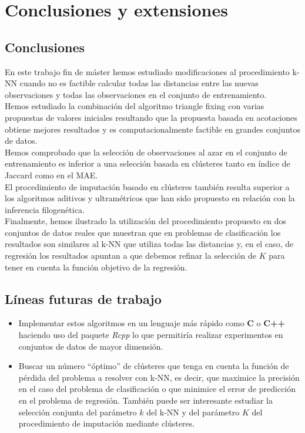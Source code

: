 \documentclass[12pt]{report} %
\theoremstyle{definition}
\begin{document}
\chapter{Conclusiones y extensiones}

\section{Conclusiones}

En este trabajo fin de máster hemos estudiado modificaciones al procedimiento k-NN cuando no es factible calcular todas las distancias entre las nuevas observaciones y todas las observaciones en el conjunto de entrenamiento.\\

Hemos estudiado la combinación del algoritmo triangle fixing con varias propuestas de valores iniciales resultando que la propuesta basada en acotaciones obtiene mejores resultados y es computacionalmente factible en grandes conjuntos de datos.\\

Hemos comprobado que la selección de observaciones al azar en el conjunto de entrenamiento es inferior a una selección basada en clústeres tanto en índice de Jaccard como en el MAE.\\

El procedimiento de imputación basado en clústeres también resulta superior a los algoritmos aditivos y ultramétricos que han sido propuesto en relación con la inferencia filogenética.\\

Finalmente, hemos ilustrado la utilización del procedimiento propuesto en dos conjuntos de datos reales que muestran que en problemas de clasificación los resultados son similares al k-NN que utiliza todas las distancias y, en el caso, de regresión los resultados apuntan a que debemos refinar la selección de $K$ para tener en cuenta la función objetivo de la regresión.

\section{Líneas futuras de trabajo}

\begin{itemize}
\item Implementar estos algoritmos en un lenguaje más rápido como \textbf{\textsf{C}} o \textbf{\textsf{C++}} haciendo uso del paquete \textit{Rcpp}\cite{Rcpp} lo que permitiría realizar experimentos en conjuntos de datos de mayor dimensión.

\item Buscar un número ``óptimo'' de clústeres que tenga en cuenta la función de pérdida del problema a resolver con k-NN, es decir, que maximice la precisión en el caso del problema de clasificación o que minimice el error de predicción en el problema de regresión. También puede ser interesante estudiar la selección conjunta del parámetro $k$ del k-NN y del parámetro $K$ del procedimiento de imputación mediante clústeres.

\end{itemize}
\end{document}

